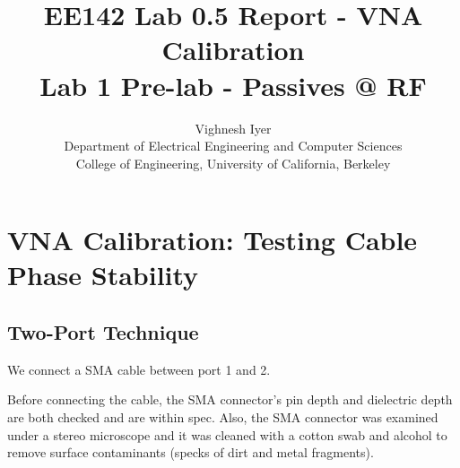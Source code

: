 \documentclass[11pt]{article}
\begin{document}
\title{EE142 Lab 0.5 Report - VNA Calibration \\
Lab 1 Pre-lab - Passives @ RF}

\author{Vighnesh Iyer \\
Department of Electrical Engineering and Computer Sciences\\
College of Engineering, University of California, Berkeley}
\date{}
\maketitle

\section{VNA Calibration: Testing Cable Phase Stability}

\subsection{Two-Port Technique}
We connect a SMA cable between port 1 and 2. 

Before connecting the cable, the SMA connector's pin depth and dielectric depth are both checked and are within spec. Also, the SMA connector was examined under a stereo microscope and it was cleaned with a cotton swab and alcohol to remove surface contaminants (specks of dirt and metal fragments).
\end{document}
